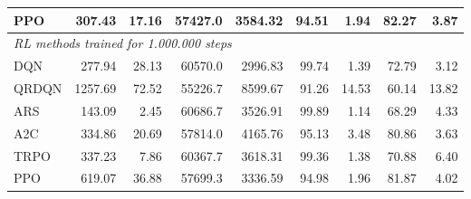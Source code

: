 \begin{samepage}
\begin{center}
\begin{tabular}{l|rr|rr|rr|rr}
    PPO          &   307.43 &    17.16 &    57427.0 &    3584.32 &   94.51 &    1.94 &   82.27 &    3.87 \\
    \midrule
    \multicolumn{9}{l}{\textit{RL methods trained for 1.000.000 steps}} \\
    \midrule
    DQN          &   277.94 &    28.13 &    60570.0 &    2996.83 &   99.74 &    1.39 &   72.79 &    3.12 \\
    QRDQN        &  1257.69 &    72.52 &    55226.7 &    8599.67 &   91.26 &   14.53 &   60.14 &   13.82 \\
    ARS          &   143.09 &     2.45 &    60686.7 &    3526.91 &   99.89 &    1.14 &   68.29 &    4.33 \\
    A2C          &   334.86 &    20.69 &    57814.0 &    4165.76 &   95.13 &    3.48 &   80.86 &    3.63 \\
    TRPO         &   337.23 &     7.86 &    60367.7 &    3618.31 &   99.36 &    1.38 &   70.88 &    6.40 \\
    PPO          &   619.07 &    36.88 &    57699.3 &    3336.59 &   94.98 &    1.96 &   81.87 &    4.02 \\
    \bottomrule
  \end{tabular}
\end{center}
\end{samepage}

